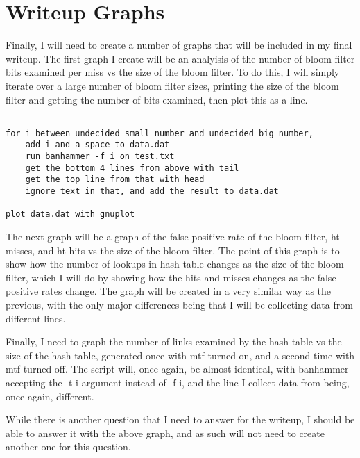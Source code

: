 \documentclass[11pt]{article}
\begin{document}
\section{Writeup Graphs}

Finally, I will need to create a number of graphs that will be included in my final writeup. The first graph I create will be an analyisis of the number of bloom filter bits examined per miss vs the size of the bloom filter. To do this, I will simply iterate over a large number of bloom filter sizes, printing the size of the bloom filter and getting the number of bits examined, then plot this as a line.

\begin{verbatim}

for i between undecided small number and undecided big number,
    add i and a space to data.dat
    run banhammer -f i on test.txt
    get the bottom 4 lines from above with tail
    get the top line from that with head
    ignore text in that, and add the result to data.dat

plot data.dat with gnuplot

\end{verbatim}

The next graph will be a graph of the false positive rate of the bloom filter, ht misses, and ht hits vs the size of the bloom filter. The point of this graph is to show how the number of lookups in hash table changes as the size of the bloom filter, which I will do by showing how the hits and misses changes as the false positive rates change. The graph will be created in a very similar way as the previous, with the only major differences being that I will be collecting data from different lines.

Finally, I need to graph the number of links examined by the hash table vs the size of the hash table, generated once with mtf turned on, and a second time with mtf turned off. The script will, once again, be almost identical, with banhammer accepting the -t i argument instead of -f i, and the line I collect data from being, once again, different.

While there is another question that I need to answer for the writeup, I should be able to answer it with the above graph, and as such will not need to create another one for this question.
\end{document}
